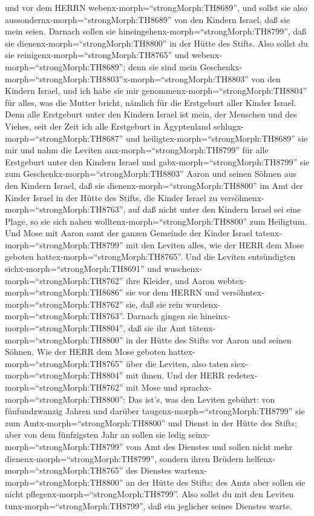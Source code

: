 und vor dem HERRN webenx-morph=``strongMorph:TH8689'',  und
sollst sie also aussondernx-morph=``strongMorph:TH8689'' von den Kindern
Israel, daß sie mein seien.  Darnach sollen sie
hineingehenx-morph=``strongMorph:TH8799'', daß sie
dienenx-morph=``strongMorph:TH8800'' in der Hütte des Stifts. Also
sollst du sie reinigenx-morph=``strongMorph:TH8765'' und
webenx-morph=``strongMorph:TH8689'';  denn sie sind mein
Geschenkx-morph=``strongMorph:TH8803''x-morph=``strongMorph:TH8803'' von
den Kindern Israel, und ich habe sie mir
genommenx-morph=``strongMorph:TH8804'' für alles, was die Mutter bricht,
nämlich für die Erstgeburt aller Kinder Israel.  Denn alle
Erstgeburt unter den Kindern Israel ist mein, der Menschen und des
Viehes, seit der Zeit ich alle Erstgeburt in Ägyptenland
schlugx-morph=``strongMorph:TH8687'' und
heiligtex-morph=``strongMorph:TH8689'' sie mir  und nahm
die Leviten anx-morph=``strongMorph:TH8799'' für alle Erstgeburt unter
den Kindern Israel  und gabx-morph=``strongMorph:TH8799''
sie zum Geschenkx-morph=``strongMorph:TH8803'' Aaron und seinen Söhnen
aus den Kindern Israel, daß sie dienenx-morph=``strongMorph:TH8800'' im
Amt der Kinder Israel in der Hütte des Stifts, die Kinder Israel zu
versöhnenx-morph=``strongMorph:TH8763'', auf daß nicht unter den Kindern
Israel sei eine Plage, so sie sich nahen
wolltenx-morph=``strongMorph:TH8800'' zum Heiligtum.  Und
Mose mit Aaron samt der ganzen Gemeinde der Kinder Israel
tatenx-morph=``strongMorph:TH8799'' mit den Leviten alles, wie der HERR
dem Mose geboten hattex-morph=``strongMorph:TH8765''.  Und
die Leviten entsündigten sichx-morph=``strongMorph:TH8691'' und
wuschenx-morph=``strongMorph:TH8762'' ihre Kleider, und Aaron
webtex-morph=``strongMorph:TH8686'' sie vor dem HERRN und
versöhntex-morph=``strongMorph:TH8762'' sie, daß sie rein
wurdenx-morph=``strongMorph:TH8763''.  Darnach gingen sie
hineinx-morph=``strongMorph:TH8804'', daß sie ihr Amt
tätenx-morph=``strongMorph:TH8800'' in der Hütte des Stifts vor Aaron
und seinen Söhnen. Wie der HERR dem Mose geboten
hattex-morph=``strongMorph:TH8765'' über die Leviten, also taten
siex-morph=``strongMorph:TH8804'' mit ihnen.  Und der HERR
redetex-morph=``strongMorph:TH8762'' mit Mose und
sprachx-morph=``strongMorph:TH8800'':  Das ist's, was den
Leviten gebührt: von fünfundzwanzig Jahren und darüber
taugenx-morph=``strongMorph:TH8799'' sie zum
Amtx-morph=``strongMorph:TH8800'' und Dienst in der Hütte des Stifts;
 aber von dem fünfzigsten Jahr an sollen sie ledig
seinx-morph=``strongMorph:TH8799'' vom Amt des Dienstes und sollen nicht
mehr dienenx-morph=``strongMorph:TH8799'',  sondern ihren
Brüdern helfenx-morph=``strongMorph:TH8765'' des Dienstes
wartenx-morph=``strongMorph:TH8800'' an der Hütte des Stifts; des Amts
aber sollen sie nicht pflegenx-morph=``strongMorph:TH8799''. Also sollst
du mit den Leviten tunx-morph=``strongMorph:TH8799'', daß ein jeglicher
seines Dienstes warte.

